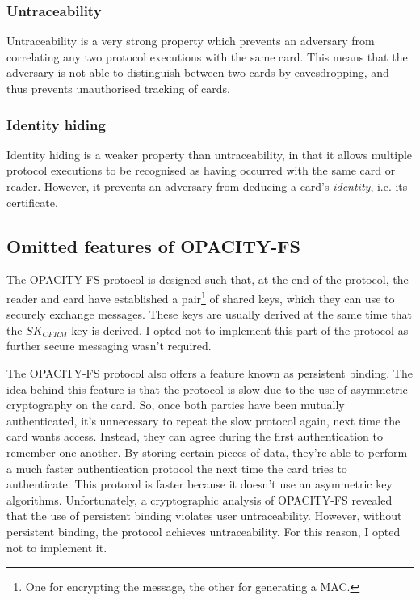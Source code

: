 \documentclass[12pt,a4paper,twoside,openright]{report}
\begin{document}
\subsubsection{Untraceability}

Untraceability is a very strong property which prevents an adversary from correlating any two protocol executions with the same card. This means that the adversary is not able to distinguish between two cards by eavesdropping, and thus prevents unauthorised tracking of cards.

\subsubsection{Identity hiding}

Identity hiding is a weaker property than untraceability, in that it allows multiple protocol executions to be recognised as having occurred with the same card or reader. However, it prevents an adversary from deducing a card's \emph{identity}, i.e. its certificate.

\subsection{Omitted features of OPACITY-FS}
\label{opacityomissions}

The OPACITY-FS protocol is designed such that, at the end of the protocol, the reader and card have established a pair\footnote{One for encrypting the message, the other for generating a MAC.} of shared keys, which they can use to securely exchange messages. These keys are usually derived at the same time that the $SK_{CFRM}$ key is derived. I opted not to implement this part of the protocol as further secure messaging wasn't required.

The OPACITY-FS protocol also offers a feature known as persistent binding. The idea behind this feature is that the protocol is slow due to the use of asymmetric cryptography on the card. So, once both parties have been mutually authenticated, it's unnecessary to repeat the slow protocol again, next time the card wants access. Instead, they can agree during the first authentication to remember one another. By storing certain pieces of data, they're able to perform a much faster authentication protocol the next time the card tries to authenticate. This protocol is faster because it doesn't use an asymmetric key algorithms. Unfortunately, a cryptographic analysis \cite{opacityanalysis} of OPACITY-FS revealed that the use of persistent binding violates user untraceability. However, without persistent binding, the protocol achieves untraceability. For this reason, I opted not to implement it.
\end{document}
